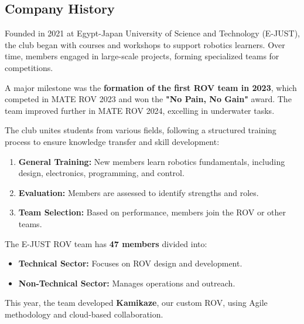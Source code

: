 \subsection{Company History}

Founded in 2021 at Egypt-Japan University of Science and Technology (E-JUST), the club began with courses and workshops to support robotics learners. Over time, members engaged in large-scale projects, forming specialized teams for competitions.

\hspace{10pt} A major milestone was the \textbf{formation of the first ROV team in 2023}, which competed in MATE ROV 2023 and won the \textbf{"No Pain, No Gain"} award. The team improved further in MATE ROV 2024, excelling in underwater tasks.

\hspace{10pt} The club unites students from various fields, following a structured training process to ensure knowledge transfer and skill development:
\vspace{-0.5\baselineskip}
\begin{enumerate}[leftmargin=0pt, itemindent=20pt]
    \setlength{\itemsep}{0pt}
    \item \textbf{General Training:} New members learn robotics fundamentals, including design, electronics, programming, and control.
    \item \textbf{Evaluation:} Members are assessed to identify strengths and roles.
    \item \textbf{Team Selection:} Based on performance, members join the ROV or other teams.
\end{enumerate}

The E-JUST ROV team has \textbf{47 members} divided into:
\vspace{-0.5\baselineskip}
\begin{itemize}[leftmargin=0pt, itemindent=20pt]
    \setlength{\itemsep}{0pt}
    \item \textbf{Technical Sector:} Focuses on ROV design and development.
    \item \textbf{Non-Technical Sector:} Manages operations and outreach.
\end{itemize}
This year, the team developed \textbf{Kamikaze}, our custom ROV, using Agile methodology and cloud-based collaboration.